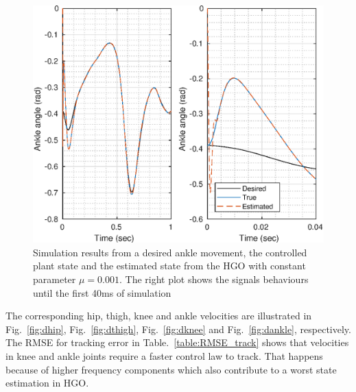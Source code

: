 \documentclass[letterpaper, 10 pt, journal, twocolumn]{IEEEtran}  %
\theoremstyle{plain}
\theoremstyle{definition}
\theoremstyle{remark}
\begin{document}
%
%
\begin{figure}[h!]
	\begin{center}
	\includegraphics[width = \columnwidth]{Figs/q_ankle_mu_1e-03.eps}
	\caption{ Simulation results from a desired ankle movement, the controlled plant state and the estimated state from the HGO with constant parameter $\mu=0.001$. The right plot shows the signals behaviours until the first 40ms of simulation}
	\label{fig:ankle}
	\end{center}
\end{figure}
%
%
%
%
The corresponding hip, thigh, knee and ankle velocities are illustrated in Fig.~\ref{fig:dhip}, Fig.~\ref{fig:dthigh}, Fig.~\ref{fig:dknee} and Fig.~\ref{fig:dankle}, respectively. The RMSE for tracking error in Table.~\ref{table:RMSE_track} shows that velocities in knee and ankle joints require a faster control law to track. That happens because of higher frequency components which also contribute to a worst state estimation in HGO.
%
%
\end{document}
